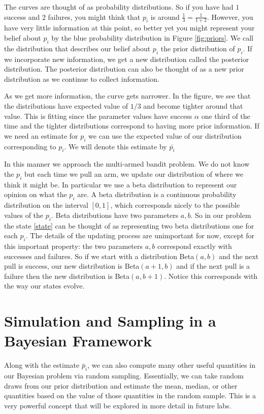 The curves are thought of as probability distributions.  So if you have had $1$ success and $2$ failures, you might think that $p_i$ is around $\frac{1}{3} = \frac{1}{1+2}$. However, you have very little information at this point, so better yet you might represent your belief about $p_i$ by the blue probability distribution in Figure \ref{fig:priors}.  We call the distribution that describes our belief about $p_i$ the prior distribution of $p_i$.  If we incorporate new information, we get a new distribution called the posterior distribution.  The posterior distribution can also be thought of as a new prior distribution as we continue to collect information.  

As we get more information, the curve gets narrower.  In the figure, we see that the distributions have expected value of $1/3$ and become tighter around that value.  This is fitting since the parameter values have success $\alpha$ one third of the time and the tighter distributions correspond to having more prior information.  If we need an estimate for $p_i$ we can use the expected value of our distribution corresponding to $p_i$.  We will denote this estimate by $\bar{p_i}$

In this manner we approach the multi-armed bandit problem.  We do not know the $p_i$ but each time we pull an arm, we update our distribution of where we think it might be.  In particular we use a beta distribution to represent our opinion on what the $p_i$ are.  A beta distribution is a continuous probability distribution on the interval $[0,1]$, which corresponds nicely to the possible values of the $p_i$.  Beta distributions have two parameters $a,b$.  So in our problem the state \eqref{state} can be thought of as representing two beta distributions one for each $p_i$. The details of the updating process are unimportant for now, except for this important property: the two parameters $a,b$ correspond exactly with successes and failures.  So if we start with a distribution Beta$(a,b)$ and the next pull is success, our new distribution is Beta$(a+1,b)$ and if the next pull is a failure then the new distribution is Beta$(a,b+1)$.  Notice this corresponds with the way our states evolve.

\section*{Simulation and Sampling in a Bayesian Framework}
Along with the estimate $\bar p_i$, we can also compute many other useful quantities in our Bayesian problem via random sampling.  Essentially, we can take random draws from our prior distribution and estimate the mean, median, or other quantities based on the value of those quantities in the random sample.  This is a very powerful concept that will be explored in more detail in future labs.

